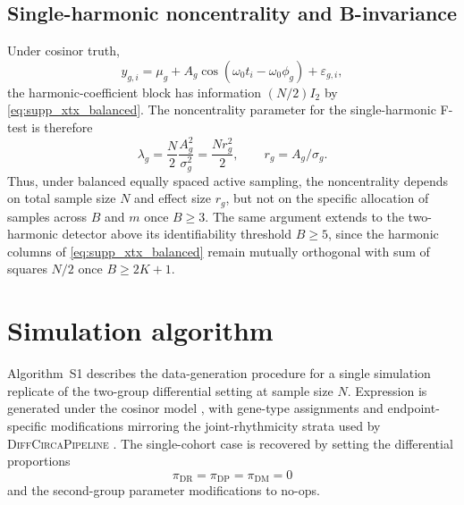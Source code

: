 \documentclass{article}
\begin{document}
\subsection{Single-harmonic noncentrality and B-invariance}

Under cosinor truth,
\[
y_{g,i}
=
\mu_g
+
A_g\cos(\omega_0 t_i - \omega_0 \phi_g)
+
\varepsilon_{g,i},
\]
the harmonic-coefficient block has information $(N/2)I_2$ by
\eqref{eq:supp_xtx_balanced}. The noncentrality parameter for the
single-harmonic F-test is therefore
\begin{equation}
\lambda_g
=
\frac{N}{2}
\frac{A_g^2}{\sigma_g^2}
=
\frac{N r_g^2}{2},
\qquad
r_g = A_g/\sigma_g.
\label{eq:supp_ncp_cosinor}
\end{equation}
Thus, under balanced equally spaced active sampling, the noncentrality
depends on total sample size $N$ and effect size $r_g$, but not on the
specific allocation of samples across $B$ and $m$ once $B \geq 3$. The
same argument extends to the two-harmonic detector above its
identifiability threshold $B \geq 5$, since the harmonic columns of
\eqref{eq:supp_xtx_balanced} remain mutually orthogonal with sum of
squares $N/2$ once $B \geq 2K + 1$.


\section{Simulation algorithm}
\label{sec:algorithm}

Algorithm~S1 describes the data-generation procedure for a single
simulation replicate of the two-group differential setting at sample
size $N$. Expression is generated under the cosinor model
\citep{cornelissen2014cosinor}, with gene-type assignments and
endpoint-specific modifications mirroring the joint-rhythmicity strata
used by \textsc{DiffCircaPipeline} \citep{xue2023diffcircapipeline}. The
single-cohort case is recovered by setting the differential
proportions
\[
\pi_{\mathrm{DR}}
=
\pi_{\mathrm{DP}}
=
\pi_{\mathrm{DM}}
=
0
\]
and the second-group parameter modifications to no-ops.
\end{document}
